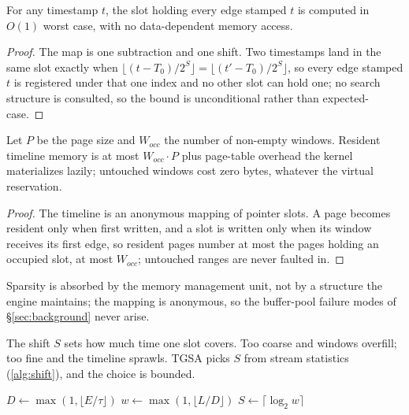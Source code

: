 \documentclass[sigconf,nonacm]{acmart}
\newcommand{\sys}{TGSA\xspace}
\begin{document}
\begin{theorem}[Addressing]
\label{thm:addr}
For any timestamp $t$, the slot holding every edge stamped $t$ is
computed in $O(1)$ worst case, with no data-dependent memory access.
\end{theorem}
\begin{proof}
The map is one subtraction and one shift. Two timestamps land in the
same slot exactly when $\lfloor (t-T_0)/2^S \rfloor = \lfloor
(t'-T_0)/2^S \rfloor$, so every edge stamped $t$ is registered under
that one index and no other slot can hold one; no search structure is
consulted, so the bound is unconditional rather than expected-case.
\end{proof}

\begin{theorem}[Space]
\label{thm:space}
Let $P$ be the page size and $W_{occ}$ the number of non-empty
windows. Resident timeline memory is at most $W_{occ}\cdot P$ plus
page-table overhead the kernel materializes lazily; untouched windows
cost zero bytes, whatever the virtual reservation.
\end{theorem}
\begin{proof}
The timeline is an anonymous mapping of pointer slots. A page becomes
resident only when first written, and a slot is written only when its
window receives its first edge, so resident pages number at most the
pages holding an occupied slot, at most $W_{occ}$; untouched ranges
are never faulted in.
\end{proof}

Sparsity is absorbed by the memory management unit, not by a structure
the engine maintains; the mapping is anonymous, so the buffer-pool
failure modes of \S\ref{sec:background} never arise.

The shift $S$ sets how much time one slot covers. Too coarse and
windows overfill; too fine and the timeline sprawls. \sys picks $S$
from stream statistics (\cref{alg:shift}), and the choice is bounded.

\begin{algorithm}[t]
\small
\DontPrintSemicolon
{}
$D \leftarrow \max(1, \lfloor E/\tau \rfloor)$ 
$w \leftarrow \max(1, \lfloor L/D \rfloor)$ 
$S \leftarrow \lceil \log_2 w \rceil$ 
\caption{\small Granularity selection.}
\label{alg:shift}
\end{algorithm}
\end{document}
